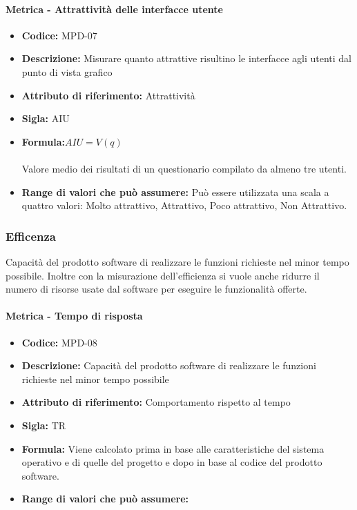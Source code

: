                    \paragraph{Metrica - Attrattività delle interfacce utente} 
                      \begin{itemize}
          \item  \textbf{Codice: } MPD-07
          \item  \textbf{Descrizione:} Misurare quanto attrattive risultino le interfacce agli utenti dal punto di vista grafico 
          \item  \textbf{Attributo di riferimento:} Attrattività
          \item  \textbf{Sigla:} AIU
           \item \textbf{Formula:}\begin{math}AIU = V (q) \end{math}\\ \\
             Valore medio dei risultati di un questionario compilato da almeno tre utenti.
          \item \textbf{Range di valori che può assumere:} Può essere utilizzata una scala a quattro valori: Molto attrattivo, Attrattivo, Poco attrattivo, Non Attrattivo.
           \end{itemize}
           
 \subsubsection{Efficenza}
 Capacità del prodotto software di realizzare le funzioni richieste nel minor tempo possibile. Inoltre con la misurazione dell’efficienza si vuole anche ridurre il numero di risorse usate dal software per eseguire le funzionalità offerte.
 
            \paragraph{Metrica - Tempo di risposta } 
               \begin{itemize}
          \item  \textbf{Codice:} MPD-08
          \item  \textbf{Descrizione:} Capacità del prodotto software di realizzare le funzioni richieste nel minor tempo possibile
         \item   \textbf{Attributo di riferimento:} Comportamento rispetto al tempo
         \item   \textbf{Sigla:} TR
         \item   \textbf{Formula:} Viene calcolato prima in base alle caratteristiche del sistema operativo e di quelle del progetto e dopo in base al codice del prodotto software.
         \item  \textbf{Range di valori che può assumere:}
            \end{itemize}
            
